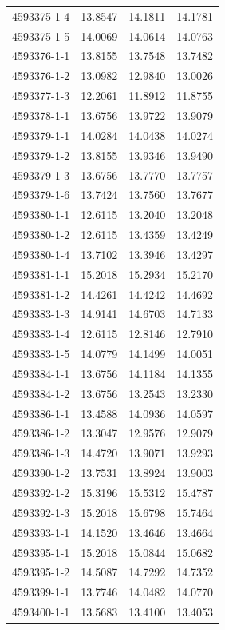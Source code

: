 \begin{longtable}{lrrr}
4593375-1-4 & 13.8547 & 14.1811 & 14.1781 \\
4593375-1-5 & 14.0069 & 14.0614 & 14.0763 \\
4593376-1-1 & 13.8155 & 13.7548 & 13.7482 \\
4593376-1-2 & 13.0982 & 12.9840 & 13.0026 \\
4593377-1-3 & 12.2061 & 11.8912 & 11.8755 \\
4593378-1-1 & 13.6756 & 13.9722 & 13.9079 \\
4593379-1-1 & 14.0284 & 14.0438 & 14.0274 \\
4593379-1-2 & 13.8155 & 13.9346 & 13.9490 \\
4593379-1-3 & 13.6756 & 13.7770 & 13.7757 \\
4593379-1-6 & 13.7424 & 13.7560 & 13.7677 \\
4593380-1-1 & 12.6115 & 13.2040 & 13.2048 \\
4593380-1-2 & 12.6115 & 13.4359 & 13.4249 \\
4593380-1-4 & 13.7102 & 13.3946 & 13.4297 \\
4593381-1-1 & 15.2018 & 15.2934 & 15.2170 \\
4593381-1-2 & 14.4261 & 14.4242 & 14.4692 \\
4593383-1-3 & 14.9141 & 14.6703 & 14.7133 \\
4593383-1-4 & 12.6115 & 12.8146 & 12.7910 \\
4593383-1-5 & 14.0779 & 14.1499 & 14.0051 \\
4593384-1-1 & 13.6756 & 14.1184 & 14.1355 \\
4593384-1-2 & 13.6756 & 13.2543 & 13.2330 \\
4593386-1-1 & 13.4588 & 14.0936 & 14.0597 \\
4593386-1-2 & 13.3047 & 12.9576 & 12.9079 \\
4593386-1-3 & 14.4720 & 13.9071 & 13.9293 \\
4593390-1-2 & 13.7531 & 13.8924 & 13.9003 \\
4593392-1-2 & 15.3196 & 15.5312 & 15.4787 \\
4593392-1-3 & 15.2018 & 15.6798 & 15.7464 \\
4593393-1-1 & 14.1520 & 13.4646 & 13.4664 \\
4593395-1-1 & 15.2018 & 15.0844 & 15.0682 \\
4593395-1-2 & 14.5087 & 14.7292 & 14.7352 \\
4593399-1-1 & 13.7746 & 14.0482 & 14.0770 \\
4593400-1-1 & 13.5683 & 13.4100 & 13.4053 \\

\end{longtable}
